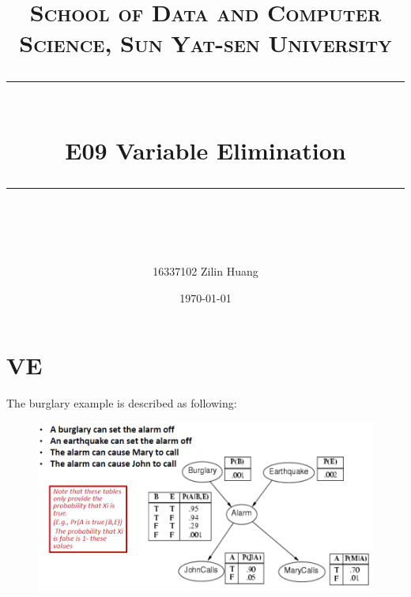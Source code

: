 ﻿\documentclass[a4paper, 11pt]{article}
\title{	
\normalfont \normalsize
\textsc{School of Data and Computer Science, Sun Yat-sen University} \\ [25pt] %
\rule{\textwidth}{0.5pt} \\[0.4cm] %
\huge  E09 Variable Elimination \\ %
\rule{\textwidth}{2pt} \\[0.5cm] %
\author{16337102 Zilin Huang}
\date{\normalsize\today}
}
\begin{document}
\maketitle
\tableofcontents
\newpage


\section{VE}

The burglary example is described as following:
\begin{figure}[h]
  \centering

  \includegraphics[width=14cm]{Pic/burglary}
\end{figure}
\end{document}
